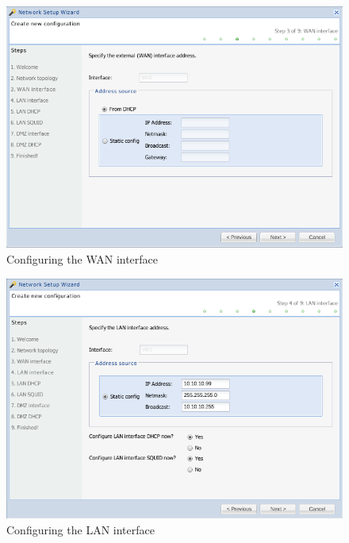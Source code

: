 \begin{figure}[H]
    \begin{center}
    \includegraphics[scale=0.38]{screenshots/etfw/etfw_wizard_03.png}
    \caption{Configuring the WAN interface}
    \label{fig:etfw_wizard_passo3}
    \end{center}
\end{figure}

\begin{figure}[H]
    \begin{center}
    \includegraphics[scale=0.38]{screenshots/etfw/etfw_wizard_04.png}
    \caption{Configuring the LAN interface}
    \label{fig:etfw_wizard_passo4}
    \end{center}
\end{figure}

